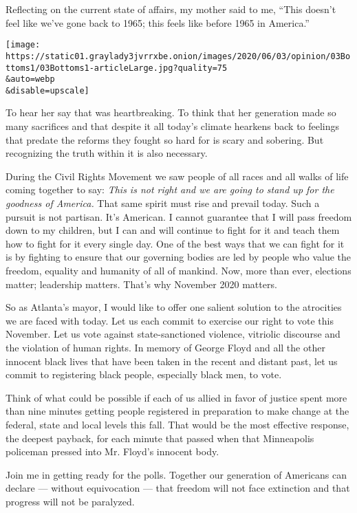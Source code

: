 Reflecting on the current state of affairs, my mother said to me, ``This
doesn't feel like we've gone back to 1965; this feels like before 1965
in America.''

\texttt{[image: https://static01.graylady3jvrrxbe.onion/images/2020/06/03/opinion/03Bottoms1/03Bottoms1-articleLarge.jpg?quality=75\\\&auto=webp\\\&disable=upscale]}

To hear her say that was heartbreaking. To think that her generation
made so many sacrifices and that despite it all today's climate hearkens
back to feelings that predate the reforms they fought so hard for is
scary and sobering. But recognizing the truth within it is also
necessary.

During the Civil Rights Movement we saw people of all races and all
walks of life coming together to say: \emph{This is not right and we are
going to stand up for the goodness of America.} That same spirit must
rise and prevail today. Such a pursuit is not partisan. It's American. I
cannot guarantee that I will pass freedom down to my children, but I can
and will continue to fight for it and teach them how to fight for it
every single day. One of the best ways that we can fight for it is by
fighting to ensure that our governing bodies are led by people who value
the freedom, equality and humanity of all of mankind. Now, more than
ever, elections matter; leadership matters. That's why November 2020
matters.

So as Atlanta's mayor, I would like to offer one salient solution to the
atrocities we are faced with today. Let us each commit to exercise our
right to vote this November. Let us vote against state-sanctioned
violence, vitriolic discourse and the violation of human rights. In
memory of George Floyd and all the other innocent black lives that have
been taken in the recent and distant past, let us commit to registering
black people, especially black men, to vote.

Think of what could be possible if each of us allied in favor of justice
spent more than nine minutes getting people registered in preparation to
make change at the federal, state and local levels this fall. That would
be the most effective response, the deepest payback, for each minute
that passed when that Minneapolis policeman pressed into Mr. Floyd's
innocent body.

Join me in getting ready for the polls. Together our generation of
Americans can declare --- without equivocation --- that freedom will not
face extinction and that progress will not be paralyzed.


